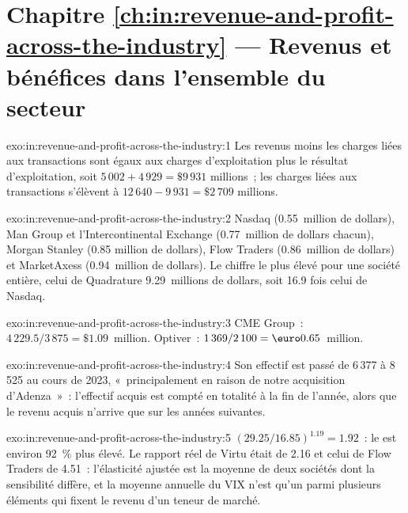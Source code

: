\section*{Chapitre \ref{ch:in:revenue-and-profit-across-the-industry} --- Revenus et bénéfices dans l'ensemble du secteur}

\begin{solution}{exo:in:revenue-and-profit-across-the-industry:1}
Les revenus moins les charges liées aux transactions sont égaux aux charges d'exploitation plus le résultat d'exploitation, soit $5\,002+4\,929=\$9\,931$ millions~;
les charges liées aux transactions s'élèvent à $12\,640-9\,931=\$2\,709$ millions.
\end{solution}

\begin{solution}{exo:in:revenue-and-profit-across-the-industry:2}
Nasdaq (0.55~million de dollars), Man Group et l'Intercontinental Exchange (0.77~million de dollars chacun), Morgan Stanley (0.85
million de dollars), Flow Traders (0.86~million de dollars) et MarketAxess (0.94~million de dollars). Le chiffre le plus élevé pour une société entière, celui de Quadrature
9.29~millions de dollars, soit 16.9 fois celui de Nasdaq.
\end{solution}

\begin{solution}{exo:in:revenue-and-profit-across-the-industry:3}
CME Group~: $4\,229.5/3\,875=\$1.09$~million. Optiver~: $1\,369/2\,100=\text{\euro}0.65$~million.
\end{solution}

\begin{solution}{exo:in:revenue-and-profit-across-the-industry:4}
Son effectif est passé de 6\,377 à 8\,525 au cours de 2023, «~principalement en raison de notre acquisition d'Adenza~»~: l'effectif acquis
est compté en totalité à la fin de l'année, alors que le revenu acquis n'arrive que sur les années suivantes.
\end{solution}

\begin{solution}{exo:in:revenue-and-profit-across-the-industry:5}
$(29.25/16.85)^{1.19}=1.92$~: le  est environ 92~\% plus élevé. Le rapport réel de Virtu était de 2.16 et celui de Flow Traders de 4.51~:
l'élasticité ajustée est la moyenne de deux sociétés dont la sensibilité diffère, et la moyenne annuelle du VIX n'est qu'un parmi plusieurs éléments qui
fixent le revenu d'un teneur de marché.
\end{solution}


